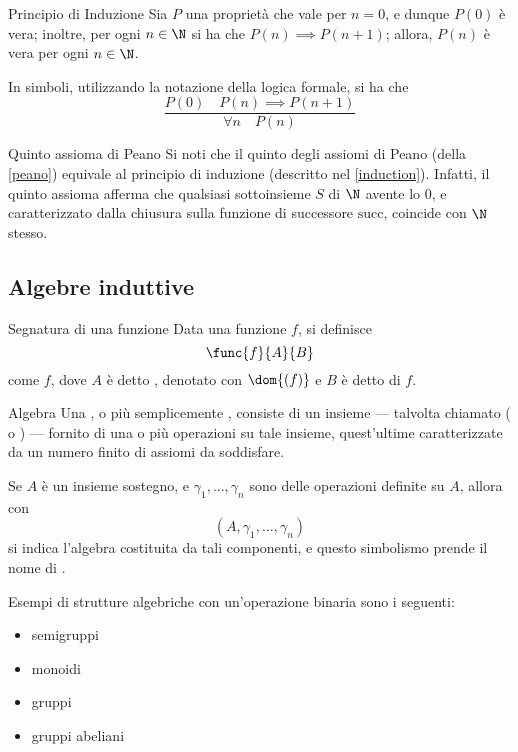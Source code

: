 \documentclass[a4paper, 12pt]{report}
\begin{document}
    \begin{framedprinc}[label={induction}]{Principio di Induzione}
        Sia $P$ una proprietà che vale per $n = 0$, e dunque $P(0)$ è vera; inoltre,  per ogni $n \in \N$ si ha che $P(n) \implies P(n + 1)$; allora, $P(n)$ è vera per ogni $n \in \N$.

        In simboli, utilizzando la notazione della logica formale, si ha che $$\dfrac{P(0) \quad P(n) \implies P(n + 1)}{\forall n \quad P(n)}$$
    \end{framedprinc}

    \begin{framedobs}{Quinto assioma di Peano}
        Si noti che il quinto degli assiomi di Peano (della \cref{peano}) equivale al principio di induzione (descritto nel \cref{induction}). Infatti, il quinto assioma afferma che qualsiasi sottoinsieme $S$ di $\N$ avente lo 0, e caratterizzato dalla chiusura sulla funzione di successore $\mathrm{succ}$, coincide con $\N$ stesso.
    \end{framedobs}

    \subsection{Algebre induttive}

    \begin{frameddefn}{Segnatura di una funzione}
        Data una funzione $f$, si definisce $$\func{f}{A}{B}$$ come  $f$, dove $A$ è detto , denotato con $\dom{(f)}$ e $B$ è detto  di $f$.
    \end{frameddefn}

    \begin{frameddefn}{Algebra}
        Una , o più semplicemente , consiste di un insieme  --- talvolta chiamato  ( o ) --- fornito di una o più operazioni su tale insieme, quest'ultime caratterizzate da un numero finito di assiomi da soddisfare.

        Se $A$ è un insieme sostegno, e $\gamma_1, \ldots , \gamma_n$ sono delle operazioni definite su $A$, allora con $$(A, \gamma_1, \ldots, \gamma_n)$$ si indica l'algebra costituita da tali componenti, e questo simbolismo prende il nome di .
    \end{frameddefn}

    \begin{example}[Algebre]
        Esempi di strutture algebriche con un'operazione binaria sono i seguenti:

        \begin{itemize}
            \item semigruppi
            \item monoidi
            \item gruppi
            \item gruppi abeliani
        \end{itemize}
    \end{example}
\end{document}
